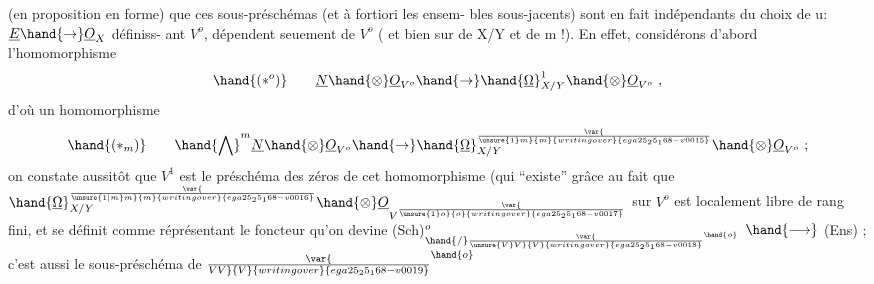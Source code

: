 (en proposition en forme) que ces sous-préschémas (et à fortiori les ensem-%
bles sous-jacents) sont en fait indépendants du choix de u:$\underline{E}\hand{\to}\underline{O}_X$ définiss-%
ant $V^o$,   dépendent seuement de  $V^o$ ( et bien sur de X/Y et de
m !).  En effet, considérons d'abord  l'homomorphisme
\[ \hand{(*^o)} \qquad \underline{N}\hand{\otimes}\underline{O}_{V^o}\hand{\to}\hand{\underline{\Omega}}^1_{X/Y}\hand{\otimes}\underline{O}_{V^o} \ , \]
d'où  un homomorphisme
\[ \hand{(*_m)} \qquad \hand{\bigwedge}^m\underline{N}\hand{\otimes}\underline{O}_{V^o}\hand{\to}\hand{\underline{\Omega}}^{\var{\over{\unsure{1}}{m}}{m}{writing over}{ega25_25_168-v0015}}_{X/Y}\hand{\otimes}\underline{O}_{V^o}\ ; \]
on constate aussitôt que $V^1$ est le préschéma des zéros de cet homomorphisme
(qui ``existe'' grâce au fait que $\hand{\underline{\Omega}}^{\var{\over{\unsure{1|m}}{m}}{m}{writing over}{ega25_25_168-v0016}}_{X/Y}\hand{\otimes}\underline{O}_{V^{\var{\over{\unsure{1}}{o}}{o}{writing over}{ega25_25_168-v0017}}}$  sur  $V^o$ est localement libre
de rang fini, et se définit comme réprésentant le foncteur qu'on devine
(Sch)$^o_{\hand{/}\var{\over{\unsure{V}}{V}}{V}{writing over}{ega25_25_168-v0018}^{\hand{o}}}$ $\hand{\longrightarrow}$ (Ens) ; c'est aussi le sous-préschéma de $\var{\over{V}{V}}{V}{writing over}{ega25_25_168-v0019}^{\hand{o}}$

